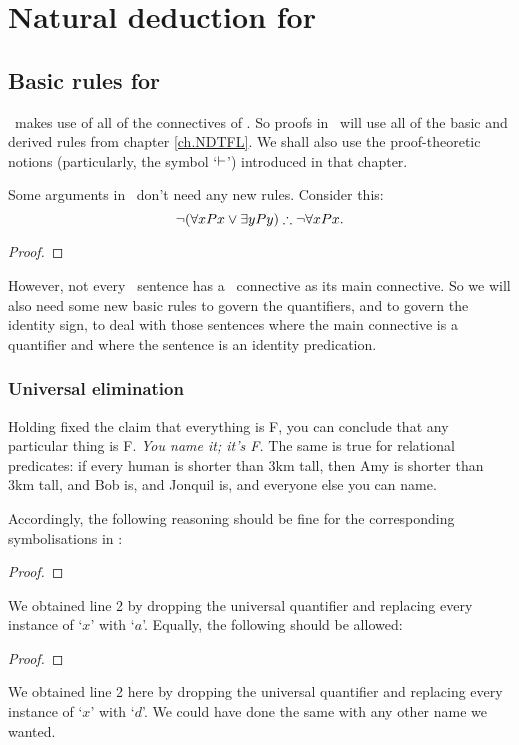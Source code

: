 \part{Natural deduction for \FOL}
\label{ch.NDFOL}

\chapter{Basic rules for \textnormal{\FOL}}\label{s:BasicFOL}

\FOL\ makes use of all of the connectives of \TFL. So proofs in \FOL\ will use all of the basic and derived rules from chapter \ref{ch.NDTFL}. We shall also use the proof-theoretic notions (particularly, the symbol `$\vdash$') introduced in that chapter. 

Some arguments in \FOL\ don't need any new rules. Consider this: $$\neg(\forall x Px \vee \exists y Py) \mathrel{\therefore} \neg \forall x Px.$$ \begin{proof}
	\open
\end{proof}

However, not every \FOL\ sentence has a \TFL\ connective as its main connective. So we will also need some new basic rules to govern the quantifiers, and to govern the identity sign, to deal with those sentences where the main connective is a quantifier and where the sentence is an identity predication.


\section{Universal elimination}\label{unielim}

Holding fixed the claim that everything is F, you can conclude that any particular thing is F. \emph{You name it; it's F.} The same is true for relational predicates: if every human is shorter than 3km tall, then Amy is shorter than 3km tall, and Bob is, and Jonquil is,  and everyone else you can name.

Accordingly, the following reasoning should be fine for the corresponding symbolisations in \FOL:
\begin{proof}
	 
\end{proof}
We obtained line 2 by dropping the universal quantifier and replacing every instance of `$x$' with `$a$'. Equally, the following should be allowed:
\begin{proof}
	 
\end{proof}
We obtained line 2 here by dropping the universal quantifier and replacing every instance of `$x$' with `$d$'. We could have done the same with any other name we wanted. 

